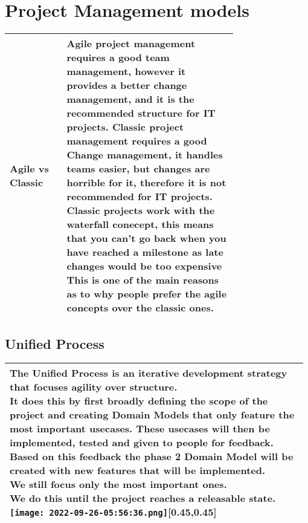\documentclass[main.tex,fontsize=8pt,paper=a4,paper=portrait,DIV=calc,]{scrartcl}
\begin{document}
\section{Project Management models}
\begin{table}[h!]
\begin{tabular}{|m{0,205\linewidth}|m{0.75\linewidth}|}
\hline
Agile vs Classic & 
Agile project management requires \textbf{a good team management}, however it provides a better change management, and it is the recommended structure for IT projects.\newline
Classic project management requires \textbf{a good Change management}, it handles teams easier, but changes are horrible for it, therefore it is not recommended for IT projects.\newline
Classic projects work with the \textbf{waterfall conecept}, this means that you can't go back when you have reached a milestone as \textbf{late changes would be too expensive}\newline
This is one of the main reasons as to why people prefer the agile concepts over the classic ones.\\
\hline
\end{tabular}
\subsection{Unified Process}
\begin{tabular}{|m{0.975\linewidth}|}
\hline
\minipg{
The Unified Process is an iterative development strategy that focuses agility over structure.\newline
It does this by first broadly defining the scope of the project and creating Domain Models that only feature the most important usecases.
These usecases will then be implemented, tested and given to people for feedback.\newline
Based on this feedback the phase 2 Domain Model will be created with new features that will be implemented.\newline We still focus only the most important ones.\newline
We do this until the project reaches a releasable state. \\}
{\texttt{[image: 2022-09-26-05:56:36.png]}}[0.45,0.45]\\
\hline
\end{tabular}

\end{table}
\end{document}
